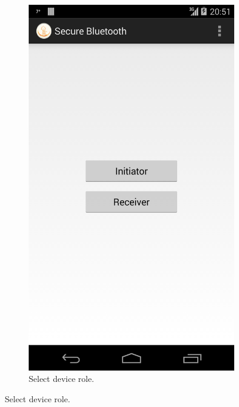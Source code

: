 \documentclass[conference, 11pt]{sty/IEEEtran}
\begin{document}
\begin{figure}
\centering
\begin{subfigure}{0.28\textwidth}
\includegraphics[width=\textwidth]{../screenshots/Screenshot_2013-12-01-20-51-28.png}
\caption{Select device role.}
\end{subfigure}


\end{figure}
\end{document}
